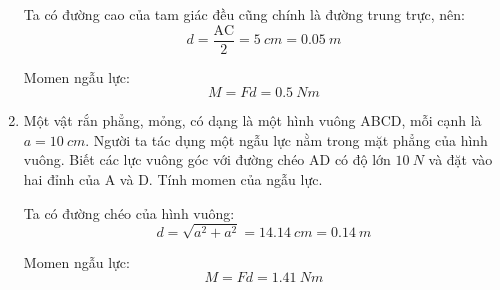 \begin{enumerate}[label=\bfseries Câu \arabic*:]
	\loigiai
	{Ta có đường cao của tam giác đều cũng chính là đường trung trực, nên:
		$$d=\dfrac{\text{AC}}{2} = \SI{5}{cm} = \SI{0.05}{m}$$
		
	Momen ngẫu lực:
	$$M=Fd = \SI{0.5}{Nm}$$
	}
	\item {}

\cauhoi
{Một vật rắn phẳng, mỏng, có dạng là một hình vuông ABCD, mỗi cạnh là $a=\SI{10}{cm}$. Người ta tác dụng một ngẫu lực nằm trong mặt phẳng của hình vuông. Biết các lực vuông góc với đường chéo AD có độ lớn $\SI{10}{N}$ và đặt vào hai đỉnh của A và D. Tính momen của ngẫu lực.
}

\loigiai
{Ta có đường chéo của hình vuông:
	$$d=\sqrt{a^2 + a^2} = \SI{14.14}{cm} = \SI{0.14}{m}$$
	
	Momen ngẫu lực:
	$$M=Fd = \SI{1.41}{Nm}$$
}
\end{enumerate}